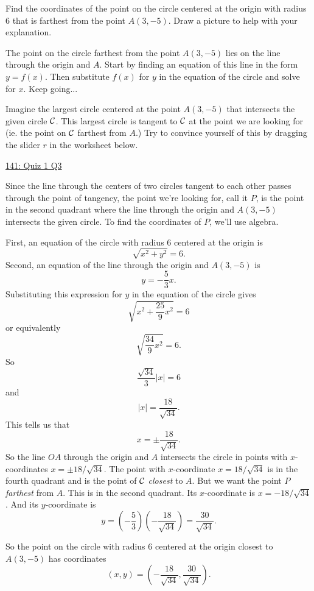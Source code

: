 \documentclass{ximera}
\begin{document}
\begin{question}  \label{Q:df454tt4443}
Find the coordinates of the point on the circle centered at the origin with radius $6$ that is farthest from the point $A(3,-5)$. Draw a picture to help with your explanation.

\begin{hint}
The point on the circle farthest from the point $A(3,-5)$ lies on the line through the origin and $A$. Start by finding an equation of this line in the form $y=f(x)$. Then substitute $f(x)$ for $y$ in the equation of the circle and solve for $x$. Keep going...
\end{hint}

\begin{explanation}

Imagine the largest circle centered at the point $A(3,-5)$ that intersects the given circle ${\cal C}$. This largest circle is tangent to ${\cal C}$ at the point we are looking for (ie. the point on ${\cal C}$ farthest from $A$.) Try to convince yourself of this by dragging the slider $r$ in the worksheet below.  
\begin{onlineOnly}
    \begin{center}
\end{center}
\end{onlineOnly}

\href{https://www.desmos.com/calculator/wwqosobejf}{141: Quiz 1 Q3}

Since the line through the centers of two circles tangent to each other passes through the point of tangency, the point we're looking for, call it $P$, is the point in the second quadrant where the line through the origin and $A(3,-5)$ intersects the given circle. To find the coordinates of $P$, we'll use algebra.

First, an equation of the circle with radius $6$ centered at the origin is
\[
     \sqrt{x^2 + y^2} = 6.
\] 
Second, an equation of the line through the origin and $A(3,-5)$ is
\[
     y = -\frac{5}{3}x .
\]
Substituting this expression for $y$ in the equation of the circle gives
\[
  \sqrt{x^2 + \frac{25}{9}x^2} = 6 
\]
or equivalently
\[
      \sqrt{\frac{34}{9}x^2} = 6 .
\]
So
\[
       \frac{\sqrt{34}}{3}|x| = 6
\]
and
\[
     | x | = \frac{18}{\sqrt{34}} .
\]
This tells us that 
\[
     x = \pm \frac{18}{\sqrt{34}} .
\]
So the line $OA$ through the origin and $A$ intersects the circle in points with $x$-coordinates $x=\pm 18/\sqrt{34}$.  The point with $x$-coordinate $x=18/\sqrt{34}$ is in the fourth quadrant and is the point of ${\cal C}$ \emph{closest} to $A$. But we want the point $P$ \emph{farthest} from $A$. This is in the second quadrant. Its $x$-coordinate is $x = -18/\sqrt{34}$. And its $y$-coordinate is
\[
    y = \left( -\frac{5}{3} \right) \left(-  \frac{18}{\sqrt{34}}  \right) = \frac{30}{\sqrt{34}}.
\]

So the point on the circle with radius $6$ centered at the origin closest to $A(3,-5)$ has coordinates
\[
   (x,y) = \left(  - \frac{18}{\sqrt{34}} ,  \frac{30}{\sqrt{34}}         \right).
\]

\end{explanation}

\end{question}
\end{document}
